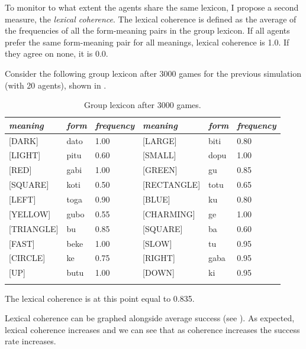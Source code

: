 To monitor to what extent the agents share the same
lexicon, I propose a second measure, the {\itshape lexical
coherence}. The lexical coherence is 
defined as the average of the frequencies of
all the form-meaning pairs in the group lexicon.
If all agents prefer the same form-meaning 
pair for all meanings, lexical coherence is 1.0. If they agree
on none, it is 0.0.

Consider the following group lexicon after 3000 games for the
previous simulation (with 20 agents), shown in . 

\begin{table}
\begin{center}
\begin{tabular}{l  l  l  l  l  l }
\lsptoprule 
{\itshape meaning} & {\itshape form} & {\itshape frequency} & {\itshape meaning} & {\itshape form} & {\itshape frequency} \\ \midrule
{}[DARK]& dato & 1.00 & [LARGE]& biti & 0.80 \\  
{}[LIGHT]& pitu & 0.60 & [SMALL]& dopu & 1.00 \\  
{}[RED]& gabi & 1.00 & [GREEN]& gu & 0.85 \\  
{}[SQUARE]& koti & 0.50 & [RECTANGLE]& totu & 0.65 \\  
{}[LEFT]& toga & 0.90 & [BLUE]& ku & 0.80 \\  
{}[YELLOW]& gubo & 0.55 & [CHARMING]& ge & 1.00 \\  
{}[TRIANGLE]& bu & 0.85 & [SQUARE]& ba & 0.60 \\  
{}[FAST]& beke & 1.00 & [SLOW]& tu & 0.95 \\  
{}[CIRCLE]& ke & 0.75 & [RIGHT]& gaba & 0.95 \\  
{}[UP]& butu & 1.00 & [DOWN]& ki & 0.95 \\  
\lspbottomrule
\end{tabular}
\caption{\label{tab:t-mem3000}Group lexicon after 3000 games.}
\end{center}
\end{table}
The lexical coherence is at this point equal to 0.835. 

Lexical coherence can be graphed alongside
average success (see ). As expected, 
lexical coherence increases 
and we can see that as coherence increases the success
rate increases.

